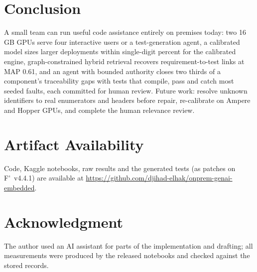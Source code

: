 \documentclass[conference]{IEEEtran}
\newcommand{\Fp}{F\'{}}  %
\begin{document}
\section{Conclusion}
A small team can run useful code assistance entirely on premises today: two 16\,GB GPUs serve four interactive
users or a test-generation agent, a calibrated model sizes larger deployments within single-digit percent for the
calibrated engine, graph-constrained hybrid retrieval recovers requirement-to-test links at MAP 0.61, and an agent
with bounded authority closes two thirds of a component's traceability gaps with tests that compile, pass and
catch most seeded faults, each committed for human review. Future work: resolve unknown identifiers to real
enumerators and headers before repair, re-calibrate on Ampere and Hopper GPUs, and complete the human relevance
review.

\section*{Artifact Availability}
Code, Kaggle notebooks, raw results and the generated tests (as patches on \Fp{}~v4.4.1) are available at
\url{https://github.com/djihad-elhak/onprem-genai-embedded}.

\section*{Acknowledgment}
The author used an AI assistant for parts of the implementation and drafting; all measurements were produced by
the released notebooks and checked against the stored records.



\end{document}
